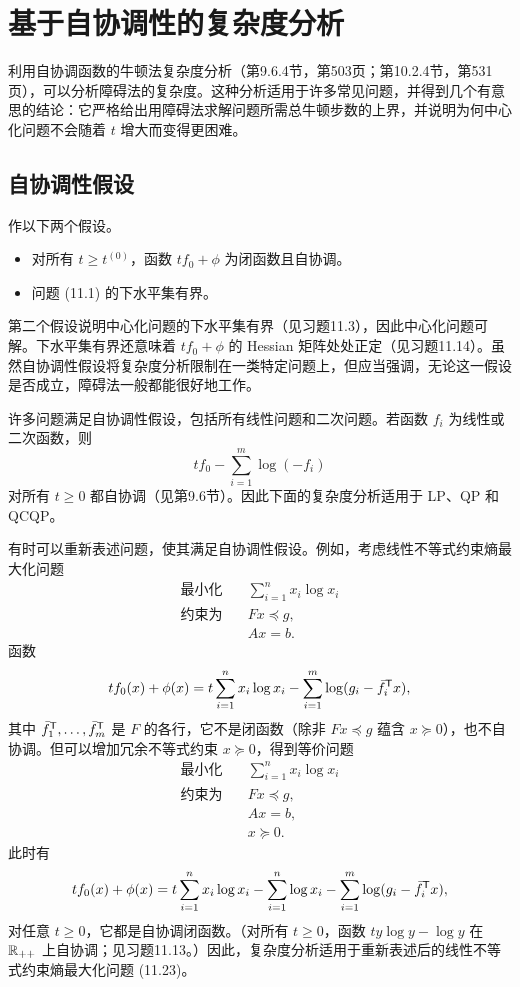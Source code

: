 \section{基于自协调性的复杂度分析}
利用自协调函数的牛顿法复杂度分析（第9.6.4节，第503页；第10.2.4节，第531页），可以分析障碍法的复杂度。这种分析适用于许多常见问题，并得到几个有意思的结论：它严格给出用障碍法求解问题所需总牛顿步数的上界，并说明为何中心化问题不会随着 $t$ 增大而变得更困难。

\subsection{自协调性假设}
作以下两个假设。
\begin{itemize}
\item 对所有 $t\ge t^{(0)}$，函数 $tf_0+\phi$ 为闭函数且自协调。
\item 问题 (11.1) 的下水平集有界。
\end{itemize}
第二个假设说明中心化问题的下水平集有界（见习题11.3），因此中心化问题可解。下水平集有界还意味着 $tf_0+\phi$ 的 Hessian 矩阵处处正定（见习题11.14）。虽然自协调性假设将复杂度分析限制在一类特定问题上，但应当强调，无论这一假设是否成立，障碍法一般都能很好地工作。

许多问题满足自协调性假设，包括所有线性问题和二次问题。若函数 $f_i$ 为线性或二次函数，则
\[
tf_0-\sum_{i=1}^m\log(-f_i)
\]
对所有 $t\ge0$ 都自协调（见第9.6节）。因此下面的复杂度分析适用于 LP、QP 和 QCQP。

有时可以重新表述问题，使其满足自协调性假设。例如，考虑线性不等式约束熵最大化问题
\[
\begin{aligned}
\text{最小化}\quad&\sum_{i=1}^n x_i\log x_i\\
\text{约束为}\quad&Fx\preceq g,\\&Ax=b.
\end{aligned}
\]
函数
\[
tf_0(x)+\phi(x)=t\sum_{i=1}^n x_i\log x_i-\sum_{i=1}^m\log(g_i-\bar f_i^\mathsf T x),
\]
其中 $\bar f_1^\mathsf T,\ldots,\bar f_m^\mathsf T$ 是 $F$ 的各行，它不是闭函数（除非 $Fx\preceq g$ 蕴含 $x\succeq0$），也不自协调。但可以增加冗余不等式约束 $x\succeq0$，得到等价问题
\begin{equation}\begin{aligned}
\text{最小化}\quad&\sum_{i=1}^n x_i\log x_i\\
\text{约束为}\quad&Fx\preceq g,\\&Ax=b,\\&x\succeq0.
\end{aligned}\tag{11.23}\end{equation}
此时有
\[
tf_0(x)+\phi(x)=t\sum_{i=1}^n x_i\log x_i-\sum_{i=1}^n\log x_i-\sum_{i=1}^m\log(g_i-\bar f_i^\mathsf T x),
\]
对任意 $t\ge0$，它都是自协调闭函数。（对所有 $t\ge0$，函数 $ty\log y-\log y$ 在 $\mathbb R_{++}$ 上自协调；见习题11.13。）因此，复杂度分析适用于重新表述后的线性不等式约束熵最大化问题 (11.23)。

